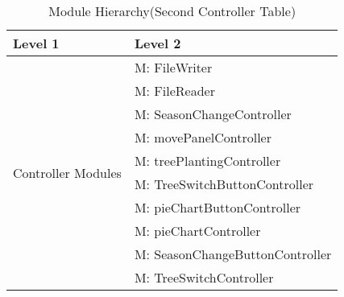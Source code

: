 \documentclass[12pt, titlepage]{article}
\newcounter{mnum}
\newcommand{\mthemnum}{M\themnum}
\begin{document}
\newpage
\begin{table}[H]
\caption{Module Hierarchy(Second Controller Table)}
\label{TblControllers}

\centering
\begin{tabular}{p{} p{}}
\toprule
\textbf{Level 1} & \textbf{Level 2}\\
\midrule

\multirow{18}{0.3\textwidth}{Controller Modules}

& {mnum} \mthemnum \label{Controller19}: FileWriter \\
& {mnum} \mthemnum \label{Controller20}: FileReader \\
& {mnum} \mthemnum \label{Controller21}: SeasonChangeController \\
& {mnum} \mthemnum \label{Controller22}: movePanelController \\
& {mnum} \mthemnum \label{Controller23}: treePlantingController \\
& {mnum} \mthemnum \label{Controller24}: TreeSwitchButtonController \\
& {mnum} \mthemnum \label{Controller25}: pieChartButtonController \\
& {mnum} \mthemnum \label{Controller26}: pieChartController \\
& {mnum} \mthemnum \label{Controller27}: SeasonChangeButtonController \\
& {mnum} \mthemnum \label{Controller28}: TreeSwitchController \\
\bottomrule

\end{tabular}

\end{table}

\newpage
\end{document}

